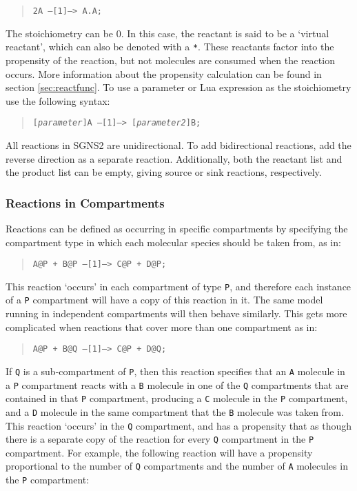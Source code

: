 \documentclass[10pt]{article}
\newcommand{\code}[1]{{\tt {#1}}}
\newcommand{\codeparam}[1]{\textrm{\textit{#1}}}
\newcommand{\programname}{SGNS2}
\begin{document}
\begin{quote}
\code{2A --[1]--> A.A;}
\end{quote}

The stoichiometry can be 0. In this case, the reactant is said to be a `virtual reactant', which can also be denoted with a \code{*}. These reactants factor into the propensity of the reaction, but not molecules are consumed when the reaction occurs. More information about the propensity calculation can be found in section \ref{sec:reactfunc}. To use a parameter or Lua expression as the stoichiometry use the following syntax:

\begin{quote}
\code{[\codeparam{parameter}]A --[1]--> [\codeparam{parameter2}]B;}
\end{quote}

All reactions in {\programname} are unidirectional. To add bidirectional reactions, add the reverse direction as a separate reaction. Additionally, both the reactant list and the product list can be empty, giving source or sink reactions, respectively.

\subsubsection{Reactions in Compartments}
\label{sec:rxn-compartments}

Reactions can be defined as occurring in specific compartments by specifying the compartment type in which each molecular species should be taken from, as in:

\begin{quote}
\code{A@P + B@P --[1]--> C@P + D@P;}
\end{quote}

This reaction `occurs' in each compartment of type \code{P}, and therefore each instance of a \code{P} compartment will have a copy of this reaction in it. The same model running in independent compartments will then behave similarly. This gets more complicated when reactions that cover more than one compartment as in:

\begin{quote}
\code{A@P + B@Q --[1]--> C@P + D@Q;}
\end{quote}

If \code{Q} is a sub-compartment of \code{P}, then this reaction specifies that an \code{A} molecule in a \code{P} compartment reacts with a \code{B} molecule in one of the \code{Q} compartments that are contained in that \code{P} compartment, producing a \code{C} molecule in the \code{P} compartment, and a \code{D} molecule in the same compartment that the \code{B} molecule was taken from. This reaction `occurs' in the \code{Q} compartment, and has a propensity that as though there is a separate copy of the reaction for every \code{Q} compartment in the \code{P} compartment. For example, the following reaction will have a propensity proportional to the number of \code{Q} compartments and the number of \code{A} molecules in the \code{P} compartment:
\end{document}
